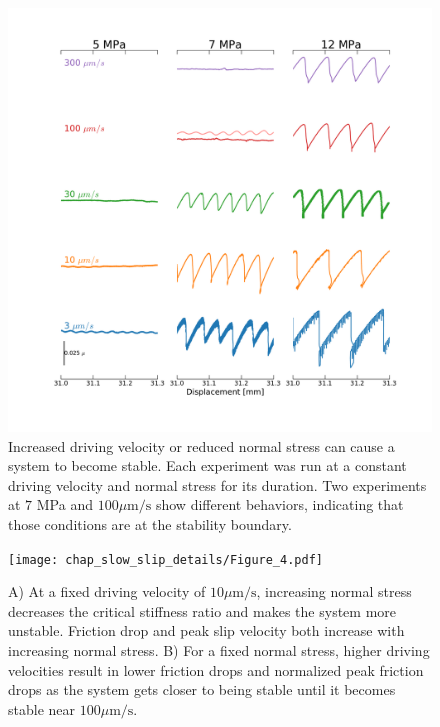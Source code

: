 \clearpage

\begin{figure}
	\centering
		\includegraphics[scale=0.4]{chap_slow_slip_details/Figure_3.pdf}
   	\caption{Increased driving velocity or reduced normal stress can cause a system to become stable. Each experiment was run at a constant driving velocity and normal stress for its duration. Two experiments at $7$ MPa and $100 \mu\text{m/s}$ show different behaviors, indicating that those conditions are at the stability boundary.}
  	\label{Figure_3}
\end{figure}

\clearpage

\begin{figure}[H]
	\centering
		\texttt{[image: chap\_slow\_slip\_details/Figure\_4.pdf]}
   	\caption{A) At a fixed driving velocity of $10 \mu\text{m/s}$, increasing normal stress decreases the critical stiffness ratio and makes the system more unstable. Friction drop and peak slip velocity both increase with increasing normal stress. B) For a fixed normal stress, higher driving velocities result in lower friction drops and normalized peak friction drops as the system gets closer to being stable until it becomes stable near $100 \mu\text{m/s}$.}
  	\label{Figure_4}
\end{figure}


